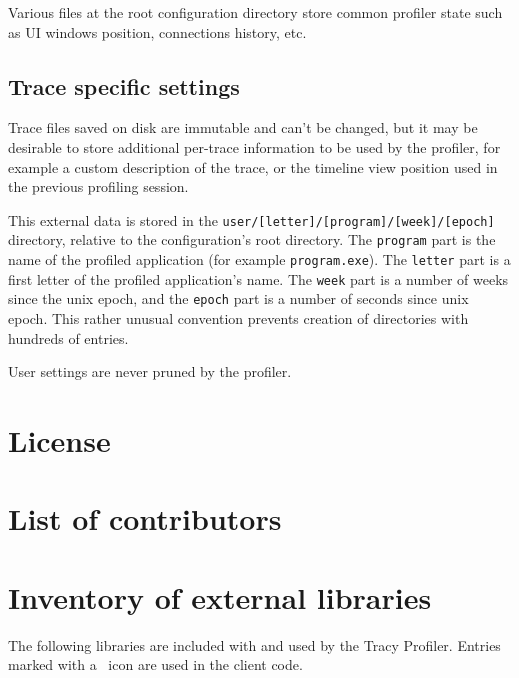 \documentclass[hidelinks,titlepage,a4paper]{article}
\begin{document}
Various files at the root configuration directory store common profiler state such as UI windows position, connections history, etc.

\subsection{Trace specific settings}
\label{tracespecific}

Trace files saved on disk are immutable and can't be changed, but it may be desirable to store additional per-trace information to be used by the profiler, for example a custom description of the trace, or the timeline view position used in the previous profiling session.

This external data is stored in the \texttt{user/[letter]/[program]/[week]/[epoch]} directory, relative to the configuration's root directory. The \texttt{program} part is the name of the profiled application (for example \texttt{program.exe}). The \texttt{letter} part is a first letter of the profiled application's name. The \texttt{week} part is a number of weeks since the unix epoch, and the \texttt{epoch} part is a number of seconds since unix epoch. This rather unusual convention prevents creation of directories with hundreds of entries.

User settings are never pruned by the profiler.

\newpage
\appendix
\appendixpage

\section{License}



\section{List of contributors}



\section{Inventory of external libraries}

The following libraries are included with and used by the Tracy Profiler. Entries marked with a \faStar{}~icon are used in the client code.
\end{document}
